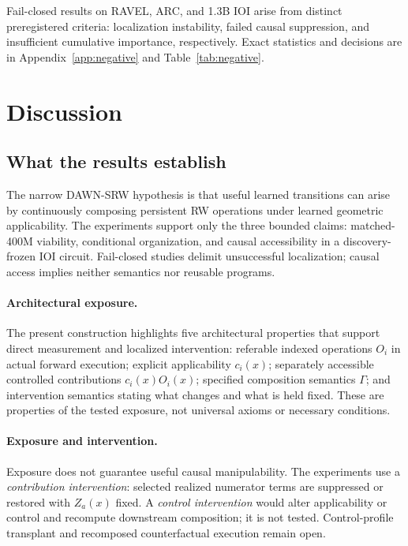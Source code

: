 \documentclass{article}
\newcommand{\DAWN}{DAWN-SRW}
\begin{document}
Fail-closed results on RAVEL, ARC, and 1.3B IOI arise from distinct
preregistered criteria:
localization instability, failed causal suppression, and insufficient
cumulative importance, respectively. Exact statistics and decisions are in
Appendix~\ref{app:negative} and Table~\ref{tab:negative}.

\section{Discussion}
\label{sec:discussion}

\subsection{What the results establish}

The narrow \DAWN{} hypothesis is that useful learned transitions can arise by
continuously composing persistent RW operations under learned geometric
applicability. The experiments support only the three bounded claims:
matched-400M viability, conditional organization, and causal accessibility in a
discovery-frozen IOI circuit. Fail-closed studies delimit unsuccessful
localization; causal access implies neither semantics nor reusable programs.

\paragraph{Architectural exposure.}
The present construction highlights five architectural properties that support
direct measurement and localized intervention: referable indexed operations
\(O_i\) in actual forward execution; explicit applicability \(c_i(x)\); separately
accessible controlled contributions \(c_i(x)O_i(x)\); specified composition
semantics \(\Gamma\); and intervention semantics stating what changes and what is
held fixed. These are properties of the tested exposure, not universal axioms or
necessary conditions.

\paragraph{Exposure and intervention.}
Exposure does not guarantee useful causal manipulability. The experiments use a
\emph{contribution intervention}: selected realized numerator terms are suppressed
or restored with \(Z_a(x)\) fixed. A \emph{control intervention} would alter
applicability or control and recompute downstream composition; it is not tested.
Control-profile transplant and recomposed counterfactual execution remain open.
\end{document}
